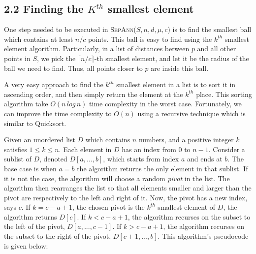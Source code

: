 \documentclass[12pt,english,]{article}
\begin{document}
\hypertarget{finding-the-kth-smallest-element}{%
\subsection{\texorpdfstring{2.2 \enspace Finding the \(K^{th}\) smallest
element}{2.2 Finding the K\^{}\{th\} smallest element}}\label{finding-the-kth-smallest-element}}

One step needed to be executed in \textsc{SepAnn($S,n,d,\mu,c$)} is to
find the smallest ball which contains at least \(n/c\) points. This ball
is easy to find using the \(k^{th}\) smallest element algorithm.
Particularly, in a list of distances between \(p\) and all other points
in \(S\), we pick the \(\lceil n/c\rceil\)-th smallest element, and let
it be the radius of the ball we need to find. Thus, all points closer to
\(p\) are inside this ball.

A very easy approach to find the \(k^{th}\) smallest element in a list
is to sort it in ascending order, and then simply return the element at
the \(k^{th}\) place. This sorting algorithm take \(O(n\,log\,n)\) time
complexity in the worst case. Fortunately, we can improve the time
complexity to \(O(n)\) using a recursive technique which is similar to
Quicksort.

Given an unordered list \(D\) which contains \(n\) numbers, and a
positive integer \(k\) satisfies \(1 \leq k \leq n\). Each element in
\(D\) has an index from \(0\) to \(n-1\). Consider a sublist of \(D\),
denoted \(D[a,...,b]\), which starts from index \(a\) and ends at \(b\).
The base case is when \(a = b\) the algorithm returns the only element
in that sublist. If it is not the case, the algorithm will choose a
random \emph{pivot} in the list. The algorithm then rearranges the list
so that all elements smaller and larger than the pivot are respectively
to the left and right of it. Now, the pivot has a new index, says \(c\).
If \(k = c-a+1\), the chosen pivot is the \(k^{th}\) smallest element of
\(D\), the algorithm returns \(D[c]\). If \(k < c-a+1\), the algorithm
recurses on the subset to the left of the pivot, \(D[a,...,c-1]\). If
\(k > c-a+1\), the algorithm recurses on the subset to the right of the
pivot, \(D[c+1,...,b]\). This algorithm's pseudocode is given below:
\end{document}
